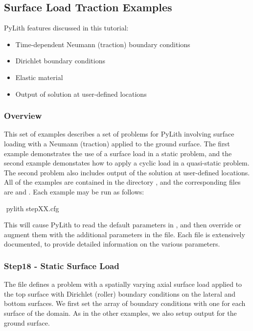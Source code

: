 \subsection{Surface Load Traction Examples}
\label{sec:example:3dhex8:surfload}

PyLith features discussed in this tutorial:
\begin{itemize}
\item Time-dependent Neumann (traction) boundary conditions
\item Dirichlet boundary conditions
\item Elastic material
\item Output of solution at user-defined locations
\end{itemize}

\subsubsection{Overview}

This set of examples describes a set of problems for PyLith involving
surface loading with a Neumann (traction) applied to the ground surface.
The first example demonstrates the use of a surface load in a static
problem, and the second example demonstates how to apply a cyclic
load in a quasi-static problem. The second problem also includes output
of the solution at user-defined locations. All of the examples are
contained in the directory , and the corresponding
 files are  and .
Each example may be run as follows:
\begin{shell}
$$ pylith stepXX.cfg
\end{shell}
This will cause PyLith to read the default parameters in ,
and then override or augment them with the additional parameters in
the  file. Each  file is extensively
documented, to provide detailed information on the various parameters.


\subsubsection{Step18 - Static Surface Load}

The  file defines a problem with a spatially varying
axial surface load applied to the top surface with Dirichlet (roller)
boundary conditions on the lateral and bottom surfaces. We first set
the array of boundary conditions with one for each surface of the
domain. As in the other examples, we also setup output for the ground
surface.

